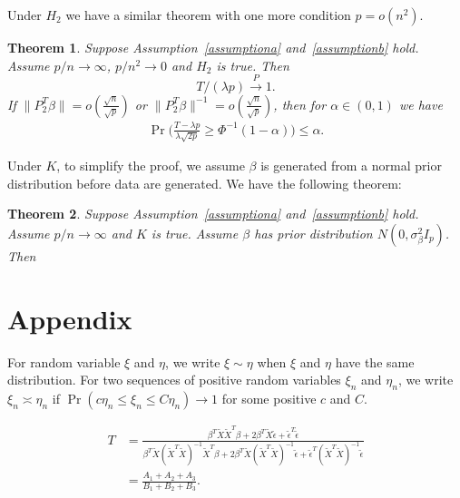 \documentclass[review]{elsarticle}
\theoremstyle{plain}
\newtheorem{theorem}{\quad\quad Theorem}
\theoremstyle{definition}
\theoremstyle{remark}
\begin{document}
Under $H_2$ we have a similar theorem with one more condition $p=o(n^2)$.
\begin{theorem}\label{theoremb}
    Suppose Assumption~\ref{assumptiona} and~\ref{assumptionb} hold.
    Assume $p/n \to  \infty$, $p/n^2 \to 0$ and $H_2$ is true. Then
            \begin{equation}
                T/(\lambda p) \xrightarrow{P} 1.
            \end{equation}
    If $\|P_2^T\beta\|=o(\frac{\sqrt{n}}{\sqrt{p}})$ or $\|P_2^T\beta\|^{-1}=o(\frac{\sqrt{n}}{\sqrt{p}})$, then for $\alpha\in (0,1)$ we have
\begin{equation}
    \begin{aligned}
    \Pr\Big(\frac{T-\lambda p}{\lambda\sqrt{2p}}\geq \Phi^{-1}(1-\alpha)\Big)\leq \alpha.
    \end{aligned}
\end{equation}
\end{theorem}


Under $K$, to simplify the proof, we assume $\beta$ is generated from a normal prior distribution before data are generated. We have the following theorem:
\begin{theorem}\label{theoremc}
   Suppose Assumption~\ref{assumptiona} and~\ref{assumptionb} hold.
    Assume $p/n \to  \infty$ and $K$ is true. Assume $\beta$ has prior distribution $N(0,\sigma_\beta^2 I_p)$. Then

\end{theorem}
\section{Appendix}

For random variable $\xi$ and $\eta$, we write $\xi\sim \eta$ when $\xi$ and $\eta$ have the same distribution. For two sequences of positive random variables $\xi_n$ and $\eta_n$, we write $\xi_n\asymp \eta_n$ if $\Pr(c\eta_n\leq\xi_n\leq C\eta_n)\to 1$ for some positive $c$ and $C$.

\begin{equation}\label{Tdecom}
    \begin{aligned}
        T&=\frac{\beta^T \tilde{X}\tilde{X}^T \beta+
        2\beta^T \tilde{X}\tilde{\epsilon}+
        \tilde{\epsilon}^T\tilde{\epsilon}
    }{\beta^T \tilde{X}{(\tilde{X}^T\tilde{X})}^{-1}\tilde{X}^T \beta+
        2\beta^T \tilde{X}{(\tilde{X}^T\tilde{X})}^{-1}\tilde{\epsilon}+
        \tilde{\epsilon}^T{(\tilde{X}^T\tilde{X})}^{-1}\tilde{\epsilon}
    }\\
        &=\frac{A_1+A_2+A_3}{B_1+B_2+B_3}.
    \end{aligned}
\end{equation}
\end{document}
